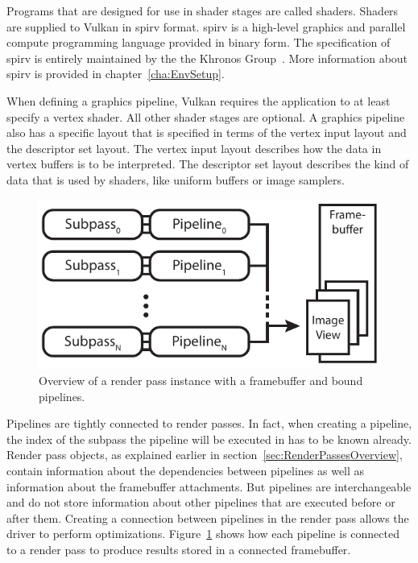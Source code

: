     Programs that are designed for use in shader stages are called shaders.
    Shaders are supplied to Vulkan in \gls{spirv} format.
    \gls{spirv} is a high-level graphics and parallel compute programming language provided in binary form.
    The specification of \gls{spirv} is entirely maintained by the the Khronos Group~\cite{spirvspecprov}.
    More information about \gls{spirv} is provided in chapter~\ref{cha:EnvSetup}.

    When defining a graphics pipeline, Vulkan requires the \gls{application} to at least specify a vertex shader.
    All other shader stages are optional.
    A graphics pipeline also has a specific layout that is specified in terms of the vertex input layout and the descriptor set layout.
    The vertex input layout describes how the data in vertex buffers is to be interpreted.
    The descriptor set layout describes the kind of data that is used by shaders, like uniform buffers or image samplers.


    \begin{figure}
      \label{fig:RenderPassInstanceSample}
      \centering
      \includegraphics[width=\textwidth]{Main/Images/RenderPassInstanceSample}
      \caption{Overview of a render pass instance with a framebuffer and bound pipelines.}
    \end{figure}

    Pipelines are tightly connected to render passes.
    In fact, when creating a pipeline, the index of the subpass the pipeline will be executed in has to be known already.
    Render pass objects, as explained earlier in section~\ref{sec:RenderPassesOverview}, contain information about the dependencies between pipelines as well as information about the framebuffer attachments.
    But pipelines are interchangeable and do not store information about other pipelines that are executed before or after them.
    Creating a connection between pipelines in the render pass allows the \gls{driver} to perform optimizations.
    Figure~\ref{fig:RenderPassInstanceSample} shows how each pipeline is connected to a render pass to produce results stored in a connected framebuffer.

